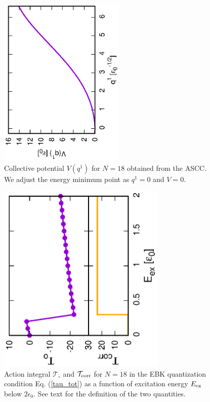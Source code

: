 \documentclass[11pt]{book} %
\begin{document}
\begin{figure}[bt]
 \begin{center}
  \includegraphics[width=60mm,angle=-90]{images/N18potential.eps}
 \end{center}
	\caption{Collective potential $V(q^1)$ for $N=18$ obtained from the ASCC.
	We adjust the energy minimum point as $q^1=0$ and $V=0$.
}
 \label{open-potential}
\end{figure}

\begin{figure}[bt]
 \begin{center}
  \includegraphics[width=80mm,angle=-90]{images/N18E_tau.eps}
 \end{center}
	\caption{Action integral $\mathcal{T}_\circ$ and $\mathcal{T}_{\rm corr}$ for $N=18$ in the EBK quantization condition Eq. (\ref{tau_tot}) as a function of excitation energy $E_{\rm ex}$ below $2\epsilon_0$. See text for the definition of the two quantities.
}
 \label{E-tau}
\end{figure}
\end{document}
